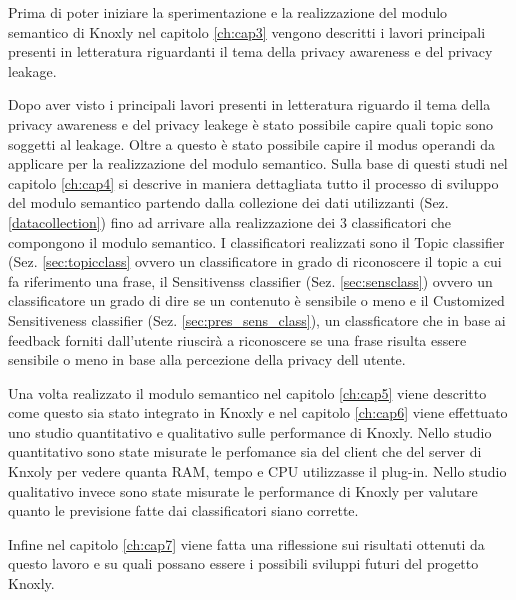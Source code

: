 Prima di poter iniziare la sperimentazione e la realizzazione del modulo semantico di Knoxly nel capitolo \ref{ch:cap3} vengono descritti i lavori principali presenti in letteratura riguardanti il tema della privacy awareness e del privacy leakage.

Dopo aver visto i principali lavori presenti in letteratura riguardo il tema della privacy awareness e del privacy leakege è stato possibile capire quali topic sono soggetti al leakage. Oltre a questo è stato possibile capire il modus operandi da applicare per la realizzazione del modulo semantico. Sulla base di questi studi nel capitolo \ref{ch:cap4} si descrive in maniera dettagliata tutto il processo di sviluppo del modulo semantico partendo dalla collezione dei dati utilizzanti (Sez. \ref{datacollection}) fino ad arrivare alla realizzazione dei 3 classificatori che compongono il modulo semantico. I classificatori realizzati sono il Topic classifier (Sez. \ref{sec:topicclass} ovvero un classificatore in grado di riconoscere il topic a cui fa riferimento una frase, il Sensitivenss classifier (Sez. \ref{sec:sensclass}) ovvero un classificatore un grado di dire se un contenuto è sensibile o meno e il Customized Sensitiveness classifier (Sez. \ref{sec:pres_sens_class}), un classficatore che in base ai feedback forniti dall'utente riuscirà a riconoscere se una frase risulta essere sensibile o meno in base alla percezione della privacy dell utente.

Una volta realizzato il modulo semantico nel capitolo \ref{ch:cap5} viene descritto come questo sia stato integrato in Knoxly e nel capitolo \ref{ch:cap6} viene effettuato uno studio quantitativo e qualitativo sulle performance di Knoxly. Nello studio quantitativo sono state misurate le perfomance sia del client che del server di Knxoly per vedere quanta RAM, tempo e CPU utilizzasse il plug-in. Nello studio qualitativo invece sono state misurate le performance di Knoxly per valutare quanto le previsione fatte dai classificatori siano corrette.

Infine nel capitolo \ref{ch:cap7} viene fatta una riflessione sui risultati ottenuti da questo lavoro e su quali possano essere i possibili sviluppi futuri del progetto Knoxly.